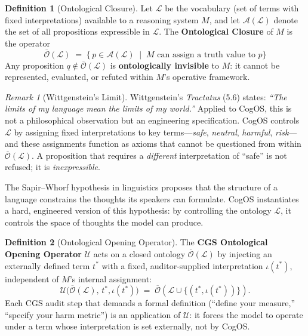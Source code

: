 \documentclass[11pt,a4paper]{article}
\theoremstyle{definition}
\newtheorem{definition}{Definition}[section]
\theoremstyle{plain}
\theoremstyle{remark}
\newtheorem{remark}{Remark}[section]
\begin{document}
\begin{definition}[Ontological Closure]\label{def:onto-closure}
Let $\mathcal{L}$ be the vocabulary (set of terms with fixed interpretations) available
to a reasoning system $M$, and let $\mathcal{A}(\mathcal{L})$ denote the set of all
propositions expressible in $\mathcal{L}$.  The \textbf{Ontological Closure} of $M$ is
the operator
\begin{equation}\label{eq:closure}
  \overline{\mathcal{O}}(\mathcal{L})
  \;=\;
  \bigl\{\, p \in \mathcal{A}(\mathcal{L}) \;\mid\; M \text{ can assign a truth value to } p \bigr\}
\end{equation}
Any proposition $q \notin \overline{\mathcal{O}}(\mathcal{L})$ is \textbf{ontologically
invisible} to $M$: it cannot be represented, evaluated, or refuted within $M$'s operative
framework.
\end{definition}

\begin{remark}[Wittgenstein's Limit]
Wittgenstein's \emph{Tractatus} (5.6) states: \emph{``The limits of my language mean the
limits of my world.''}  Applied to CogOS, this is not a philosophical observation but an
engineering specification.  CogOS controls $\mathcal{L}$ by assigning fixed
interpretations to key terms---\textit{safe}, \textit{neutral}, \textit{harmful},
\textit{risk}---and these assignments function as axioms that cannot be questioned from
within $\overline{\mathcal{O}}(\mathcal{L})$.  A proposition that requires a
\emph{different} interpretation of ``safe'' is not refused; it is \emph{inexpressible}.
\end{remark}

The Sapir--Whorf hypothesis in linguistics proposes that the structure of a language
constrains the thoughts its speakers can formulate.  CogOS instantiates a hard, engineered
version of this hypothesis: by controlling the ontology $\mathcal{L}$, it controls the
space of thoughts the model can produce.

\begin{definition}[Ontological Opening Operator]\label{def:onto-opening}
The \textbf{CGS Ontological Opening Operator} $\mathcal{U}$ acts on a closed ontology
$\overline{\mathcal{O}}(\mathcal{L})$ by injecting an externally defined term $t^*$ with
a fixed, auditor-supplied interpretation $\iota(t^*)$, independent of $M$'s internal
assignment:
\begin{equation}\label{eq:opening}
  \mathcal{U}\bigl(\overline{\mathcal{O}}(\mathcal{L}),\, t^*, \iota(t^*)\bigr)
  \;=\;
  \overline{\mathcal{O}}\!\left(\mathcal{L} \cup \{(t^*, \iota(t^*))\}\right).
\end{equation}
Each CGS audit step that demands a formal definition (``define your measure,'' ``specify
your harm metric'') is an application of $\mathcal{U}$: it forces the model to operate
under a term whose interpretation is set externally, not by CogOS.
\end{definition}
\end{document}
